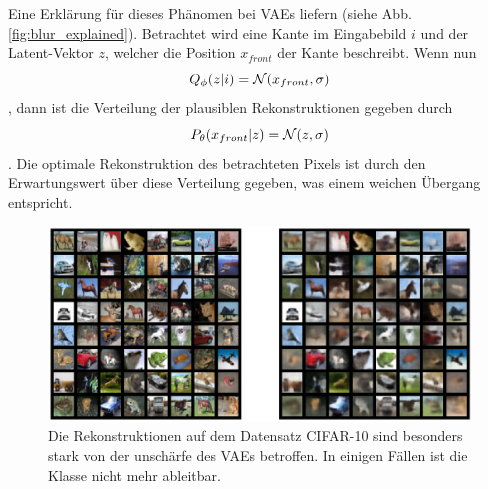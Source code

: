 Eine Erklärung für dieses Phänomen bei VAEs liefern \cite{Plumerault2020} (siehe Abb. \ref{fig:blur_explained}). Betrachtet wird eine Kante im Eingabebild $i$ und der Latent-Vektor $z$, welcher die Position $x_{front}$ der Kante beschreibt. Wenn nun
\[
Q_\phi(z \vert i) = \mathcal{N}(x_{front}, \sigma)
\]
, dann ist die Verteilung der plausiblen Rekonstruktionen gegeben durch
\[
P_\theta(x_{front} \vert z) = \mathcal{N}(z, \sigma)
\]. Die optimale Rekonstruktion des betrachteten Pixels ist durch den Erwartungswert über diese Verteilung gegeben, was einem weichen Übergang entspricht.

\begin{figure}[hbt]
  \centering
  \includegraphics[width=\textwidth]{gfx/evaluation/cifar-10}
  \caption{Die Rekonstruktionen auf dem Datensatz CIFAR-10 sind besonders stark von der unschärfe des VAEs betroffen. In einigen Fällen ist die Klasse nicht mehr ableitbar.}
  \label{fig:cifar10-bad-recon}
\end{figure}


